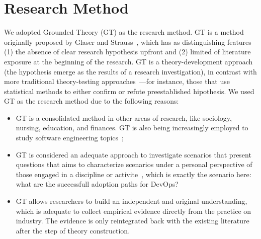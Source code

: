 \section{Research Method} \label{sec:research_method}

We adopted Grounded Theory (GT) as the research method. GT is a method
originally proposed by Glaser and Strauss~\cite{glase1967discovery}, which has
as distinguishing features (1) the absence of clear research hypothesis upfront
and (2) limited of literature exposure at the beginning of the research. GT
is a theory-development approach (the hypothesis emerge as the results of
a research investigation), in contrast with more traditional
theory-testing approaches~\cite{coleman2007using}---for instance,  those that
use statistical methods to either confirm or refute preestablished hipothesis.
We used GT as the research method due to the following reasons:



\begin{itemize}

\item GT is a consolidated method in other areas of research, like sociology,
nursing, education, and finances. GT is also being increasingly employed
to study software engineering topics~\cite{Hoda:2017:ICSE,stol2016grounded,Waterman:2015:ICSE};

\item GT is considered an adequate approach to investigate scenarios that present
  questions that aims to characterize scenarios under a personal perspective of those
  engaged in a discipline or activite~\cite{barnsteiner2002using},
which is exactly the scenario here: what are the successfull adoption paths for DevOps?

\item GT allows researchers to build an independent and original understanding,
which is adequate to collect empirical evidence directly from the
practice on industry. The evidence
is only reintegrated back with the existing literature after the step of
theory construction.

\end{itemize}

